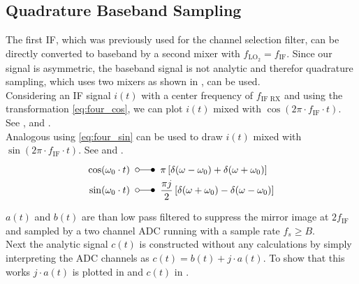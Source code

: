 \subsection{Quadrature Baseband Sampling}
\label{sec:rx_adc_1}
The first \gls{IF}, which was previously used for the channel selection filter,
can be directly converted to baseband by a second mixer with
$f_{\text{LO}_2} = f_{\text{IF}}$.
Since our signal is asymmetric, the baseband signal is not analytic
and therefor quadrature sampling, which uses two mixers as shown in
, can be used. \\

Considering an \gls{IF} signal $i(t)$ with a center frequency of
$f_{\text{IF RX}}$ and using the transformation \eqref{eq:four_cos},
we can plot $i(t)$ mixed with $\cos(2\pi \cdot f_{\text{IF}} \cdot t)$.
See , 
and . \\

Analogous using \eqref{eq:four_sin} can be used to draw $i(t)$ mixed with
$\sin(2\pi \cdot f_{\text{IF}} \cdot t)$.
See  and . \\

\begin{align}
  \cos(\omega_0 \cdot t) \;\; & \laplace \;\; \pi
  \left[\delta(\omega - \omega_0) + \delta(\omega + \omega_0) \right]
  \label{eq:four_cos} \\
  \sin(\omega_0 \cdot t) \;\; & \laplace \;\; \frac{\pi j}{2}
  \left[\delta(\omega + \omega_0) - \delta(\omega - \omega_0) \right]
  \label{eq:four_sin}
\end{align}

$a(t)$ and $b(t)$ are than low pass filtered to suppress the mirror image
at $2 f_{\text{IF}}$ and sampled by a two channel \gls{ADC} running with a
sample rate $f_s \geq B$. \\

Next the analytic signal $c(t)$ is constructed without any calculations
by simply interpreting the \gls{ADC} channels as
$c(t) = b(t) + j \cdot a(t)$. To show that this works $j \cdot a(t)$
is plotted in  and
$c(t)$ in .

